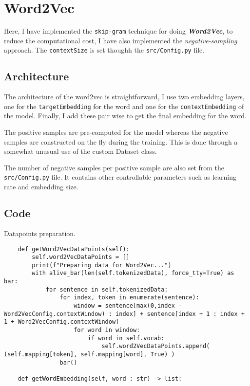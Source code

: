 \section*{Word2Vec}
\label{sec:word2vec}

Here, I have implemented the \verb|skip-gram| technique for doing \textbf{\textit{Word2Vec}}, to reduce the computational cost, I have also implemented the \textit{negative-sampling} approach. The \verb|contextSize| is set thoughh the \verb|src/Config.py| file.

\subsection*{Architecture}

The architecture of the word2vec is straightforward, I use two embedding layers, one for the \verb|targetEmbedding| for the word and one for the \verb|contextEmbedding| of the model. Finally, I add these pair wise to get the final embedding for the word. 

The positive samples are pre-computed for the model whereas the negative samples are constructed on the fly during the training. This is done through a somewhat unusual use of the custom Dataset class. 

The number of negative samples per positive sample are also set from the \verb|src/Config.py| file. It contains other controllable parameters such as learning rate and embedding size.

\subsection*{Code}
Datapoints preparation.

\begin{lstlisting}
    def getWord2VecDataPoints(self):
        self.word2VecDataPoints = []
        print(f"Preparing data for Word2Vec...")
        with alive_bar(len(self.tokenizedData), force_tty=True) as bar:
            for sentence in self.tokenizedData:
                for index, token in enumerate(sentence):
                    window = sentence[max(0,index - Word2VecConfig.contextWindow) : index] + sentence[index + 1 : index + 1 + Word2VecConfig.contextWindow]
                    for word in window:
                        if word in self.vocab:
                            self.word2VecDataPoints.append( (self.mapping[token], self.mapping[word], True) )
                bar()

    def getWordEmbedding(self, word : str) -> list:
\end{lstlisting}

